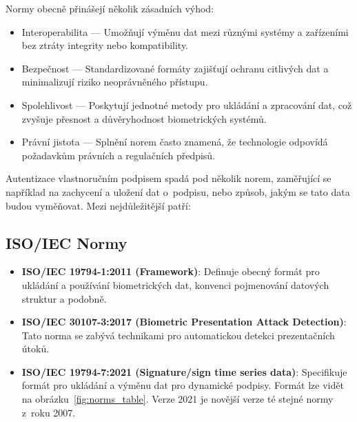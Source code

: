 \noindent
Normy obecně přinášejí několik zásadních výhod:
\begin{itemize}
  \item Interoperabilita --- Umožňují výměnu dat mezi různými systémy a zařízeními bez ztráty integrity nebo kompatibility.
  \item Bezpečnost --- Standardizované formáty zajišťují ochranu citlivých dat a minimalizují riziko neoprávněného přístupu.
  \item Spolehlivost --- Poskytují jednotné metody pro ukládání a zpracování dat, což zvyšuje přesnost a důvěryhodnost biometrických systémů.
  \item Právní jistota --- Splnění norem často znamená, že technologie odpovídá požadavkům právních a regulačních předpisů.
\end{itemize}

Autentizace vlastnoručním podpisem spadá pod několik norem, zaměřující se například na zachycení a uložení dat o~podpisu, nebo způsob, jakým se tato data budou vyměňovat. 
Mezi nejdůležitější patří:

\subsection*{ISO/IEC Normy}
\begin{itemize}
  \item \textbf{ISO/IEC 19794-1:2011 (Framework)}: 
  Definuje obecný formát pro ukládání a používání biometrických dat, konvenci pojmenování datových struktur a podobně.\cite{iso19794-1_2011} %

  \item \textbf{ISO/IEC 30107-3:2017 (Biometric Presentation Attack Detection)}: 
  Tato norma se zabývá technikami pro automatickou detekci prezentačních útoků.~\cite{ISO/IEC30107-3_2017} %

  \item \textbf{ISO/IEC 19794-7:2021 (Signature/sign time series data)}:
  Specifikuje formát pro ukládání a výměnu dat pro dynamické podpisy. 
  Formát lze vidět na obrázku~\ref{fig:norms_table}. 
  Verze 2021 je novější verze té stejné normy z~roku 2007.~\cite{ISOIEC19794-7_2021} %
\end{itemize}

